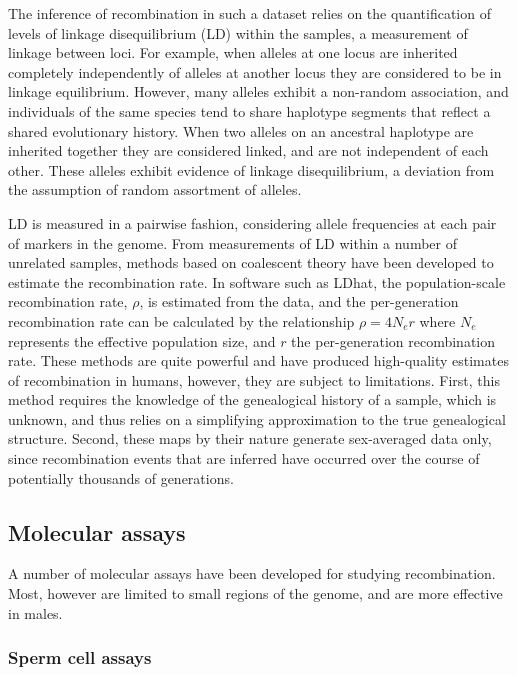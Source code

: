 The inference of recombination in such a dataset relies on the quantification of levels of linkage disequilibrium (LD) within the samples, a measurement of linkage between loci.
For example, when alleles at one locus are inherited completely independently of alleles at another locus they are considered to be in linkage equilibrium.
However, many alleles exhibit a non-random association, and individuals of the same species tend to share haplotype segments that reflect a shared evolutionary history.
When two alleles on an ancestral haplotype are inherited together they are considered linked, and are not independent of each other.
These alleles exhibit evidence of linkage disequilibrium, a deviation from the assumption of random assortment of alleles.

LD is measured in a pairwise fashion, considering allele frequencies at each pair of markers in the genome.
From measurements of LD within a number of unrelated samples, methods based on coalescent theory have been developed to estimate the recombination rate\cite{Auton2012}.
In software such as LDhat\cite{Mcvean2004,Auton2007,Auton2014}, the population-scale recombination rate, $\rho$, is estimated from the data, and the per-generation recombination rate can be calculated by the relationship
$\rho = 4 N_e r$
where $N_e$ represents the effective population size, and $r$ the per-generation recombination rate.
These methods are quite powerful and have produced high-quality estimates of recombination in humans\cite{hapmap2007}, however, they are subject to limitations.
First, this method requires the knowledge of the genealogical history of a sample, which is unknown, and thus relies on a simplifying approximation to the true genealogical structure.
Second, these maps by their nature generate sex-averaged data only, since recombination events that are inferred have occurred over the course of potentially thousands of generations.


\subsection{Molecular assays}

A number of molecular assays have been developed for studying recombination.
Most, however are limited to small regions of the genome, and are more effective in males.

\subsubsection{Sperm cell assays}

